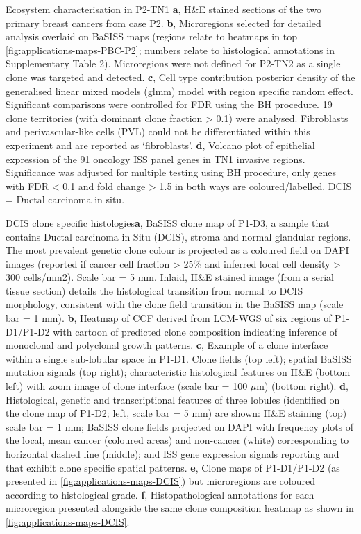     {Ecosystem characterisation in P2-TN1}
    {\textbf{a}, H\&E stained sections of the two primary breast cancers from case P2. \textbf{b}, Microregions selected for detailed analysis overlaid on BaSISS maps (regions relate to heatmaps in top \cref{fig:applications-maps-PBC-P2}; numbers relate to histological annotations in Supplementary Table 2). Microregions were not defined for P2-TN2 as a single clone was targeted and detected. \textbf{c}, Cell type contribution posterior density of the generalised linear mixed models (glmm) model with region specific random effect. Significant comparisons were controlled for \ac{FDR} using the \ac{BH} procedure. 19 clone territories (with dominant clone fraction > 0.1) were analysed. Fibroblasts and perivascular-like cells (PVL) could not be differentiated within this experiment and are reported as `fibroblasts'. \textbf{d}, Volcano plot of epithelial expression of the 91 oncology \ac{ISS} panel genes in TN1 invasive regions. Significance was adjusted for multiple testing using BH procedure, only genes with \ac{FDR} < 0.1 and fold change > 1.5 in both ways are coloured/labelled. \ac{DCIS} = Ductal carcinoma in situ.}

    {DCIS clone specific histologies}{\textbf{a}, \ac{BaSISS} clone map of P1-D3, a sample that contains Ductal carcinoma in Situ (DCIS), stroma and normal glandular regions. The most prevalent genetic clone colour is projected as a coloured field on DAPI images (reported if cancer cell fraction > 25\% and inferred local cell density > 300 cells/mm2). Scale bar = 5 mm. Inlaid, H\&E stained image (from a serial tissue section) details the histological transition from normal to DCIS morphology, consistent with the clone field transition in the \ac{BaSISS} map (scale bar = 1 mm). \textbf{b}, Heatmap of \ac{CCF} derived from \ac{LCM}-\ac{WGS} of six regions of P1-D1/P1-D2 with cartoon of predicted clone composition indicating inference of monoclonal and polyclonal growth patterns. \textbf{c}, Example of a clone interface within a single sub-lobular space in P1-D1. Clone fields (top left); spatial \ac{BaSISS} mutation signals (top right); characteristic histological features on H\&E (bottom left) with zoom image of clone interface (scale bar = 100 $\mu$m) (bottom right). \textbf{d}, Histological, genetic and transcriptional features of three lobules (identified on the clone map of P1-D2; left, scale bar = 5 mm) are shown: H\&E staining (top) scale bar = 1 mm; \ac{BaSISS} clone fields projected on DAPI with frequency plots of the local, mean cancer (coloured areas) and non-cancer (white) corresponding to horizontal dashed line (middle); and \ac{ISS} gene expression signals reporting  and  that exhibit clone specific spatial patterns. \textbf{e}, Clone maps of P1-D1/P1-D2 (as presented in \cref{fig:applications-maps-DCIS}) but microregions are coloured according to histological grade. \textbf{f}, Histopathological annotations for each microregion presented alongside the same clone composition heatmap as shown in \cref{fig:applications-maps-DCIS}.}

